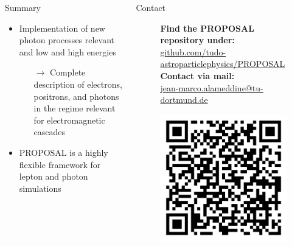\documentclass[t]{beamer}
\begin{document}
  \begin{columns}[onlytextwidth]%
    \begin{column}{0.4\textwidth}%
      \begin{block}[equal height group=Z]{Summary}%
        \begin{itemize}
          \item Implementation of new photon processes relevant and low and high energies
          \begin{itemize}
            \item[$\rightarrow$] Complete description of electrons, positrons, and photons in the regime relevant for electromagnetic cascades
          \end{itemize}
          \item PROPOSAL is a highly flexible framework for lepton and photon simulations
        \end{itemize}
      \end{block}
    \end{column}
    \begin{column}{0.4\textwidth}%
      \begin{block}[equal height group=Z]{Contact}%
        \begin{center}
          \begin{figure}[ht]
            \begin{minipage}[ht]{0.75\linewidth}
              \textbf{Find the PROPOSAL repository under:}\\ \url{github.com/tudo-astroparticlephysics/PROPOSAL} \vspace{0.5em}\\
              \textbf{Contact via mail:}\\ \href{mailto:me@jean-marco.alameddine@tu-dortmund.de}{jean-marco.alameddine@tu-dortmund.de} 
            \end{minipage}
            \begin{minipage}[ht]{0.24\linewidth}
              \centering
                \includegraphics[width=0.66\linewidth, valign=t]{images/qr_proposal.png}
            \end{minipage}
          \end{figure}
        \end{center}
      \end{block}
    \end{column}
    \end{columns}
\end{document}
